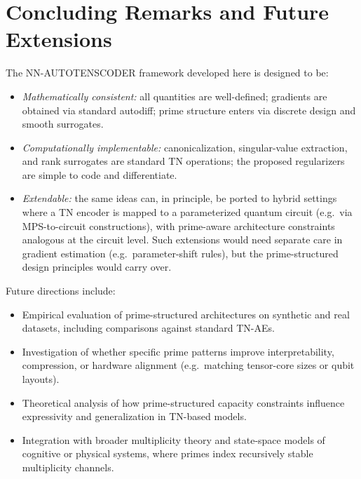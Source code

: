 \documentclass[11pt]{article}
\begin{document}
\section{Concluding Remarks and Future Extensions}

The NN-AUTOTENSCODER framework developed here is designed to be:

\begin{itemize}[leftmargin=1.5em]
    \item \emph{Mathematically consistent:} all quantities are well-defined; gradients are obtained via standard autodiff; prime structure enters via discrete design and smooth surrogates.

    \item \emph{Computationally implementable:} canonicalization, singular-value extraction, and rank surrogates are standard TN operations; the proposed regularizers are simple to code and differentiate.

    \item \emph{Extendable:} the same ideas can, in principle, be ported to hybrid settings where a TN encoder is mapped to a parameterized quantum circuit (e.g.\ via MPS-to-circuit constructions), with prime-aware architecture constraints analogous at the circuit level. Such extensions would need separate care in gradient estimation (e.g.\ parameter-shift rules), but the prime-structured design principles would carry over.
\end{itemize}

Future directions include:
\begin{itemize}[leftmargin=1.5em]
    \item Empirical evaluation of prime-structured architectures on synthetic and real datasets, including comparisons against standard TN-AEs.

    \item Investigation of whether specific prime patterns improve interpretability, compression, or hardware alignment (e.g.\ matching tensor-core sizes or qubit layouts).

    \item Theoretical analysis of how prime-structured capacity constraints influence expressivity and generalization in TN-based models.

    \item Integration with broader multiplicity theory and state-space models of cognitive or physical systems, where primes index recursively stable multiplicity channels.
\end{itemize}
\end{document}
